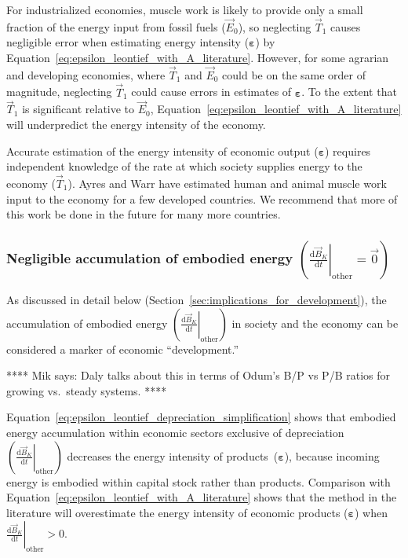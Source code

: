 For industrialized economies, muscle work 
is likely to provide only a small fraction
of the energy input from fossil fuels ($\vec{E}_{0}$),
so neglecting $\vec{T}_{1}$ causes negligible error when
estimating energy intensity ($\bm{\varepsilon}$) by
Equation~\ref{eq:epsilon_leontief_with_A_literature}.
However, for some agrarian 
and developing economies, 
where $\vec{T}_{1}$ and $\vec{E}_{0}$ 
could be on the same order of magnitude,
neglecting $\vec{T}_{1}$ could cause errors
in estimates of $\bm{\varepsilon}$.
To the extent that $\vec{T}_{1}$ 
is significant relative to $\vec{E}_{0}$,
Equation~\ref{eq:epsilon_leontief_with_A_literature}
will underpredict the energy intensity of the economy.

Accurate estimation of the energy intensity of economic output ($\bm{\varepsilon}$)
requires independent knowledge of the rate at which society supplies
energy to the economy ($\vec{T}_{1}$). 
Ayres and Warr have estimated human and animal muscle work
input to the economy for a few developed countries.\cite{Ayres:2010ug}
We recommend that more of this work be done 
in the future for many more countries.


\subsubsection{Negligible accumulation of embodied energy
$\left( \left. \frac{\mathrm{d}\vec{B}_{K}}{\mathrm{d}t} \right|_{\mathrm{other}} = \vec{0} \right)$}

As discussed in detail below (Section~\ref{sec:implications_for_development}),
the accumulation of embodied energy 
$\left( \left. \frac{\mathrm{d}\vec{B}_{K}}{\mathrm{d}t} \right|_{\mathrm{other}} \right)$
in society and the economy
can be considered a marker of economic ``development.''

**** 
Mik says: Daly talks about this in terms 
of Odum's B/P vs P/B ratios for growing vs.\ steady systems.
****

Equation~\ref{eq:epsilon_leontief_depreciation_simplification} 
shows that embodied energy accumulation within economic sectors 
exclusive of depreciation
$\left( \left. \frac{\mathrm{d}\vec{B}_{K}}{\mathrm{d}t} \right|_{\mathrm{other}} \right)$ 
decreases the energy intensity of products~($\bm{\varepsilon}$),
because incoming energy is embodied within capital stock rather than products.
Comparison with Equation~\ref{eq:epsilon_leontief_with_A_literature}
shows that the method in the literature will overestimate the energy intensity
of economic products ($\bm{\varepsilon}$) when 
$\left. \frac{\mathrm{d}\vec{B}_{K}}{\mathrm{d}t} \right|_{\mathrm{other}} > 0$.

